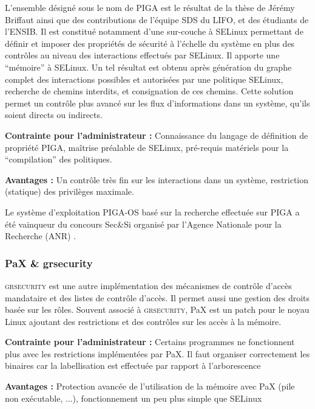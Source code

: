 \documentclass[pdftex,a4paper,titlepage,11pt]{article}
\begin{document}
L'ensemble désigné sous le nom de PIGA est le résultat de la thèse de Jérémy Briffaut ainsi que des contributions de l'équipe SDS du LIFO, et des étudiants de l'ENSIB. Il est constitué notamment d'une sur-couche à SELinux permettant de définir et imposer des propriétés de sécurité à l'échelle du système en plus des contrôles au niveau des interactions effectués par SELinux. Il apporte une ``mémoire'' à SELinux. Un tel résultat est obtenu après génération du graphe complet des interactions possibles et autorisées par une politique SELinux, recherche de chemins interdits, et consignation de ces chemins. Cette solution permet un contrôle plus avancé sur les flux d'informations dans un système, qu'ils soient directs ou indirects.
\begin{list}{}{}
 \item \textbf{Contrainte pour l'administrateur :} Connaissance du langage de définition de propriété PIGA, maîtrise préalable de SELinux, pré-requis matériels pour la ``compilation'' des politiques.
 \item \textbf{Avantages :} Un contrôle très fin sur les interactions dans un système, restriction (statique) des privilèges maximale.
\end{list}

Le système d'exploitation PIGA-OS basé sur la recherche effectuée sur PIGA a été vainqueur du concours Sec\&Si organisé par l'Agence Nationale pour la Recherche (ANR) \cite{PIGASAINTMALO}\cite{PIGAPROP}.

\subsubsection{PaX \& grsecurity}

\textsc{grsecurity} est une autre implémentation des mécanismes de contrôle d'accès mandataire et des listes de contrôle d'accès. Il permet aussi une gestion des droits basée sur les rôles. Souvent associé à \textsc{grsecurity}, PaX est un patch pour le noyau Linux ajoutant des restrictions et des contrôles sur les accès à la mémoire.
\begin{list}{}{}
 \item \textbf{Contrainte pour l'administrateur :} Certains programmes ne fonctionnent plus avec les restrictions implémentées par PaX. Il faut organiser correctement les binaires car la labellisation est effectuée par rapport à l'arborescence
 \item \textbf{Avantages :} Protection avancée de l'utilisation de la mémoire avec PaX (pile non exécutable, ...), fonctionnement un peu plus simple que SELinux
\end{list}
\end{document}
